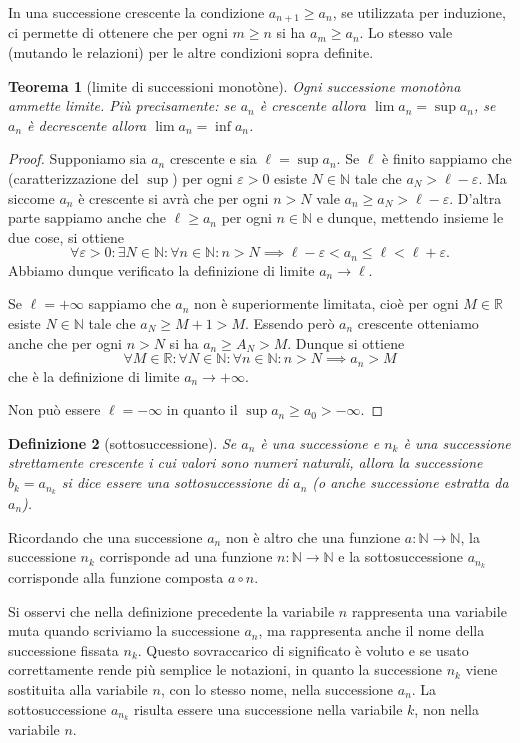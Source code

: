 \documentclass[italian,a4paper,oneside,headinclude]{scrbook}
\newcommand{\myemph}[1]{\emph{#1}\marginpar{#1}}
\newcommand{\eps}{\varepsilon}
\newcommand{\NN}{\mathbb N}
\newcommand{\RR}{\mathbb R}
\newtheorem{theorem}{Teorema}
\newtheorem{definition}[theorem]{Definizione}
\begin{document}
In una successione crescente la condizione $a_{n+1} \ge a_n$,
se utilizzata per induzione, ci permette
di ottenere che per ogni $m\ge n$ si ha $a_m \ge a_n$.
Lo stesso vale (mutando le relazioni) per le altre condizioni sopra definite.

\begin{theorem}[limite di successioni monotòne]
Ogni successione monotòna ammette limite.
Più precisamente: se $a_n$ è crescente allora $\lim a_n = \sup a_n$,
se $a_n$ è decrescente allora $\lim a_n = \inf a_n$.
\end{theorem}
%
\begin{proof}
Supponiamo sia $a_n$ crescente e sia $\ell = \sup a_n$.
Se $\ell$ è finito sappiamo che (caratterizzazione del $\sup$)
per ogni $\eps>0$ esiste $N\in \NN$ tale che $a_N> \ell -\eps$.
Ma siccome $a_n$ è crescente si avrà che per ogni $n>N$ vale
$a_n \ge a_N > \ell-\eps$.
D'altra parte sappiamo anche che $\ell\ge a_n$ per ogni $n\in \NN$
e dunque, mettendo insieme le due cose, si ottiene
\[
  \forall \eps>0 \colon \exists N\in \NN \colon \forall n\in \NN\colon
   n>N \implies \ell-\eps < a_n \le \ell < \ell + \eps.
\]
Abbiamo dunque verificato la definizione di limite $a_n \to \ell$.

Se  $\ell=+\infty$ sappiamo che $a_n$ non è superiormente limitata, cioè per ogni $M\in \RR$ esiste $N\in \NN$ tale che $a_N \ge M+1 > M$.
Essendo però $a_n$ crescente otteniamo anche che per ogni $n>N$ si
 ha $a_n \ge A_N > M$. Dunque si ottiene
 \[
 \forall M\in \RR\colon\forall N\in \NN\colon \forall n \in \NN\colon
  n>N \implies a_n > M
 \]
 che è la definizione di limite $a_n \to +\infty$.

Non può essere $\ell = -\infty$ in quanto il $\sup a_n \ge a_0 > -\infty$.
\end{proof}

\begin{definition}[sottosuccessione]
Se $a_n$ è una successione e $n_k$ è una successione strettamente crescente i cui valori sono numeri naturali, allora la successione
$b_k = a_{n_k}$ si dice essere una \myemph{sottosuccessione} di $a_n$
(o anche \emph{successione estratta} da $a_n$).
\end{definition}

Ricordando che una successione $a_n$ non è altro che una funzione
$a\colon \NN \to \NN$, la successione $n_k$ corrisponde ad una funzione
$n\colon \NN \to \NN$ e la sottosuccessione $a_{n_k}$ corrisponde alla funzione composta $a \circ n$.

Si osservi che nella definizione precedente la variabile $n$ rappresenta
una variabile muta quando scriviamo la successione $a_n$, ma
rappresenta anche il nome della successione fissata $n_k$.
Questo sovraccarico
di significato è voluto e se usato correttamente rende più semplice
le notazioni, in quanto la successione $n_k$ viene sostituita alla
variabile $n$, con lo stesso nome, nella successione $a_n$.
La sottosuccessione $a_{n_k}$ risulta essere una successione nella variabile $k$, non nella variabile $n$.
\end{document}
